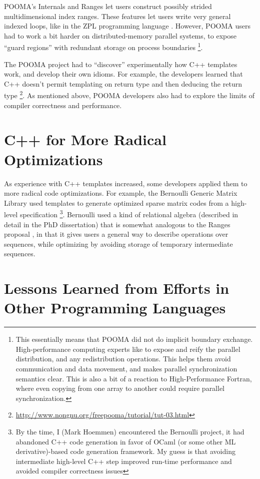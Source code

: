 POOMA's Internals and Ranges let users construct possibly strided
multidimensional index ranges.  These features let users write very general
indexed loops, like in the ZPL programming language \cite{Chamberlain1998}.
However, POOMA users had to work a bit harder on distributed-memory parallel
systems, to expose “guard regions” with redundant storage on process boundaries
\footnote{ This essentially means that POOMA did not do implicit boundary
  exchange.  High-performance computing experts like to expose and reify the
  parallel distribution, and any redistribution operations. This helps them
  avoid communication and data movement, and makes parallel synchronization
  semantics clear.  This is also a bit of a reaction to High-Performance
  Fortran, where even copying from one array to another could require parallel
  synchronization.
}.

The POOMA project had to “discover” experimentally how C++ templates work, and
develop their own idioms. For example, the developers learned that C++ doesn't
permit templating on return type and then deducing the return type
\footnote{\url{http://www.nongnu.org/freepooma/tutorial/tut-03.html}}.
As mentioned above, POOMA developers also had to explore the limits of compiler
correctness and performance.

\section{C++ for More Radical Optimizations}

As experience with C++ templates increased, some developers applied them to more
radical code optimizations.  For example, the Bernoulli Generic Matrix Library
used templates to generate optimized sparse matrix codes from a high-level
specification \footnote{\cite{Ahmed2000} By the time, I (Mark Hoemmen)
encountered the Bernoulli project, it had abandoned C++ code generation in
favor of OCaml (or some other ML derivative)-based code generation framework.
My guess is that avoiding intermediate high-level C++ step improved run-time
performance and avoided compiler correctness issues}.  Bernoulli used a kind of
relational algebra (described in detail in the PhD dissertation) that is
somewhat analogous to the Ranges proposal \cite{Niebler2018}, in that it gives
users a general way to describe operations over sequences, while optimizing by
avoiding storage of temporary intermediate sequences.

\section{Lessons Learned from Efforts in Other Programming Languages}


